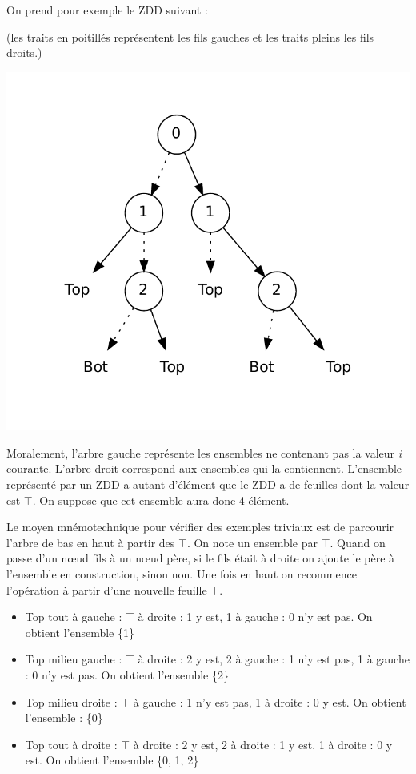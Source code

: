 \documentclass[a4paper]{article}
\begin{document}
On prend pour exemple le ZDD suivant : 

(les traits en poitillés représentent les fils gauches et les traits pleins les
fils droits.)
\begin{center}
\includegraphics[scale=0.4]{../imports/zdd_ex.pdf}
\end{center}

Moralement, l'arbre gauche représente les ensembles ne contenant 
pas la valeur
\emph{i} courante. L'arbre droit correspond aux ensembles qui
la contiennent.
L'ensemble représenté par un ZDD a autant d'élément que le ZDD a de feuilles 
dont la valeur est $\top$. On suppose que cet ensemble aura donc 4 élément.

Le moyen mnémotechnique pour vérifier des exemples triviaux est de parcourir 
l'arbre de bas en haut à partir des $\top$. On note un ensemble par $\top$.
Quand on passe d'un n\oe ud fils à un n\oe ud père, si le fils était à droite
on ajoute le père à l'ensemble en construction, sinon non. Une fois en haut
on recommence l'opération à partir d'une nouvelle feuille $\top$.

\begin{itemize}
\item Top tout à gauche : $\top$ à droite : 1 y est, 1 à gauche : 0 n'y est pas.
On obtient l'ensemble \{1\}
\item Top milieu gauche : $\top$ à droite : 2 y est, 2 à gauche : 1 n'y est pas,
1 à gauche : 0 n'y est pas. On obtient l'ensemble \{2\}
\item Top milieu droite : $\top$ à gauche : 1 n'y est pas, 1 à droite : 0 y est.
On obtient l'ensemble : \{0\}
\item Top tout à droite : $\top$ à droite : 2 y est, 2 à droite : 1 y est. 1 à
droite : 0 y est. On obtient l'ensemble \{0, 1, 2\}
\end{itemize}
\end{document}
